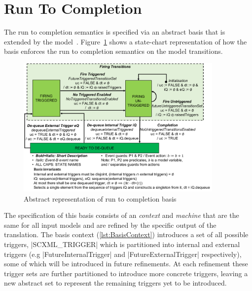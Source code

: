 

\section{Run To Completion}
\label{sec:run-completion}
The run to completion semantics is specified via an abstract basis that is extended by the model~\cite{MoSnHo18,MoSnHo-ABZ2020}. 
Figure~\ref{fig:basis} shows a state-chart representation of how the basis enforces 
the run to completion semantics on the model transitions. 

\begin{figure}[!h]
	\vspace{-.4cm}
	\centering
	\includegraphics[width=0.90\textwidth, trim=30 50 60 0]{figures/Picture6.png}
	\caption{Abstract representation of run to completion basis}
	\label{fig:basis}
	\vspace{-.4cm}
\end{figure}

The specification of this basis consists of an \EVENTB \emph{context} and \emph{machine} that are the same for all input models and are refined by the specific output of the translation.  
The basis context (\ref{lst:BasisContext}) introduces a set of all possible triggers, |SCXML_TRIGGER| which is partitioned into internal and external triggers 
(e.g |FutureInternalTrigger| and |FutureExternalTrigger| respectively), 
some of which will be introduced in future refinements. 
At each refinement these trigger sets are further partitioned to introduce more concrete triggers, 
leaving a new abstract set to represent the remaining triggers yet to be introduced. 

